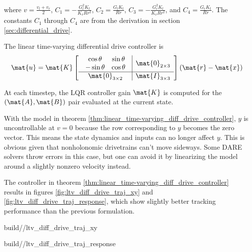 \begin{theorem}
  where $v = \frac{v_l + v_r}{2}$, $C_1 = -\frac{G_l^2 K_t}{K_v R r^2}$,
  $C_2 = \frac{G_l K_t}{Rr}$, $C_3 = -\frac{G_r^2 K_t}{K_v R r^2}$, and
  $C_4 = \frac{G_r K_t}{Rr}$. The constants $C_1$ through $C_4$ are from the
  derivation in section \ref{sec:differential_drive}.

  The linear time-varying differential drive controller is
  \begin{equation}
    \mat{u} = \mat{K}
    \left[
      \begin{array}{c|c}
        \begin{array}{cc}
          \cos\theta & \sin\theta \\
          -\sin\theta & \cos\theta
        \end{array} & \mat{0}_{2 \times 3} \\
        \hline
        \mat{0}_{3 \times 2} & \mat{I}_{3 \times 3}
      \end{array}
    \right]
    (\mat{r} - \mat{x})
  \end{equation}

  At each timestep, the LQR controller gain $\mat{K}$ is computed for the
  $(\mat{A}, \mat{B})$ pair evaluated at the current state.
\end{theorem}

With the \gls{model} in theorem
\ref{thm:linear_time-varying_diff_drive_controller}, $y$ is uncontrollable at
$v = 0$ because the row corresponding to $y$ becomes the zero vector. This means
the state dynamics and inputs can no longer affect $y$. This is obvious given
that nonholonomic drivetrains can't move sideways. Some DARE solvers throw
errors in this case, but one can avoid it by linearizing the model around a
slightly nonzero velocity instead.

The controller in theorem \ref{thm:linear_time-varying_diff_drive_controller}
results in figures \ref{fig:ltv_diff_drive_traj_xy} and
\ref{fig:ltv_diff_drive_traj_response}, which show slightly better tracking
performance than the previous formulation.
\begin{bookfigure}
  \begin{minisvg}{2}{build/\chapterpath/ltv_diff_drive_traj_xy}
    \caption{Linear time-varying differential drive controller x-y plot}
    \label{fig:ltv_diff_drive_traj_xy}
  \end{minisvg}
  \hfill
  \begin{minisvg}{2}{build/\chapterpath/ltv_diff_drive_traj_response}
    \caption{Linear time-varying differential drive controller response}
    \label{fig:ltv_diff_drive_traj_response}
  \end{minisvg}
\end{bookfigure}

